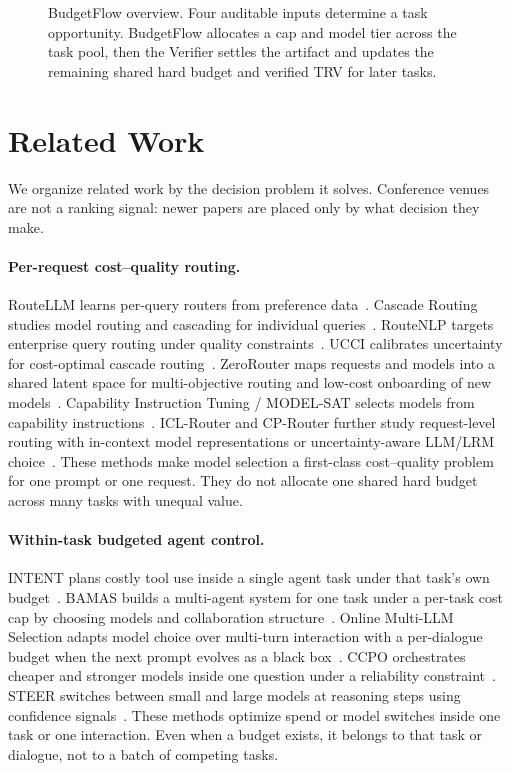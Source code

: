 \documentclass[letterpaper]{article}
\newcommand{\method}{BudgetFlow\xspace}
\newcommand{\trv}{TRV\xspace}
\newcommand{\verifier}{Verifier\xspace}
\begin{document}
\begin{figure}[t]
\caption{\method overview. Four auditable inputs determine a task opportunity. BudgetFlow allocates a cap and model tier across the task pool, then the \verifier settles the artifact and updates the remaining shared hard budget and verified \trv for later tasks.}
\label{fig:overview}
\end{figure}

\section{Related Work}
\label{sec:related}
We organize related work by the decision problem it solves. Conference venues are not a ranking signal: newer papers are placed only by what decision they make.

\paragraph{Per-request cost--quality routing.}
RouteLLM learns per-query routers from preference data~\cite{routellm}. Cascade Routing studies model routing and cascading for individual queries~\cite{cascade-routing}. RouteNLP targets enterprise query routing under quality constraints~\cite{routenlp}. UCCI calibrates uncertainty for cost-optimal cascade routing~\cite{ucci}. ZeroRouter maps requests and models into a shared latent space for multi-objective routing and low-cost onboarding of new models~\cite{zerorouter}. Capability Instruction Tuning / MODEL-SAT selects models from capability instructions~\cite{model-sat}. ICL-Router and CP-Router further study request-level routing with in-context model representations or uncertainty-aware LLM/LRM choice~\cite{icl-router,cp-router}. These methods make model selection a first-class cost--quality problem for one prompt or one request. They do not allocate one shared hard budget across many tasks with unequal value.

\paragraph{Within-task budgeted agent control.}
INTENT plans costly tool use inside a single agent task under that task's own budget~\cite{intent}. BAMAS builds a multi-agent system for one task under a per-task cost cap by choosing models and collaboration structure~\cite{bamas}. Online Multi-LLM Selection adapts model choice over multi-turn interaction with a per-dialogue budget when the next prompt evolves as a black box~\cite{onlinemultillm}. CCPO orchestrates cheaper and stronger models inside one question under a reliability constraint~\cite{ccpo}. STEER switches between small and large models at reasoning steps using confidence signals~\cite{steer}. These methods optimize spend or model switches inside one task or one interaction. Even when a budget exists, it belongs to that task or dialogue, not to a batch of competing tasks.
\end{document}
